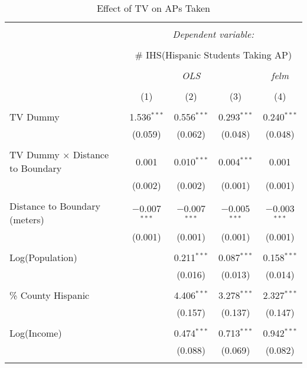 
\begin{table}[!htbp] \centering 
  \caption{Effect of TV on APs Taken} 
  \label{} 
\begin{tabular}{@{\extracolsep{-2pt}}lcccc} 
\\[-1.8ex]\hline 
\hline \\[-1.8ex] 
 & \multicolumn{4}{c}{\textit{Dependent variable:}} \\ 
\cline{2-5} 
\\[-1.8ex] & \multicolumn{4}{c}{\# IHS(Hispanic Students Taking AP)} \\ 
\\[-1.8ex] & \multicolumn{3}{c}{\textit{OLS}} & \textit{felm} \\ 
\\[-1.8ex] & (1) & (2) & (3) & (4)\\ 
\hline \\[-1.8ex] 
 TV Dummy & 1.536$^{***}$ & 0.556$^{***}$ & 0.293$^{***}$ & 0.240$^{***}$ \\ 
  & (0.059) & (0.062) & (0.048) & (0.048) \\ 
  & & & & \\ 
 TV Dummy $\times$ Distance to Boundary & 0.001 & 0.010$^{***}$ & 0.004$^{***}$ & 0.001 \\ 
  & (0.002) & (0.002) & (0.001) & (0.001) \\ 
  & & & & \\ 
 Distance to Boundary (meters) & $-$0.007$^{***}$ & $-$0.007$^{***}$ & $-$0.005$^{***}$ & $-$0.003$^{***}$ \\ 
  & (0.001) & (0.001) & (0.001) & (0.001) \\ 
  & & & & \\ 
 Log(Population) &  & 0.211$^{***}$ & 0.087$^{***}$ & 0.158$^{***}$ \\ 
  &  & (0.016) & (0.013) & (0.014) \\ 
  & & & & \\ 
 \% County Hispanic &  & 4.406$^{***}$ & 3.278$^{***}$ & 2.327$^{***}$ \\ 
  &  & (0.157) & (0.137) & (0.147) \\ 
  & & & & \\ 
 Log(Income) &  & 0.474$^{***}$ & 0.713$^{***}$ & 0.942$^{***}$ \\ 
  &  & (0.088) & (0.069) & (0.082) \\ 
  & & & & \\ 

\end{tabular}
\end{table}

